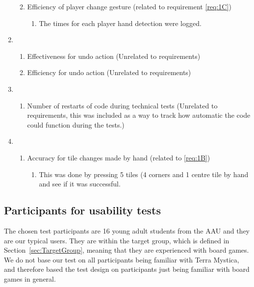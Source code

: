 \begin{enumerate}
\begin{enumerate}
\begin{enumerate}
		\end{enumerate}
		\item Efficiency of player change gesture (related to requirement \ref{req:1C})
		\begin{enumerate}
				\item The times for each player hand detection were logged.
		\end{enumerate}
	\end{enumerate}
	\item \begin{enumerate}
		\item Effectiveness for undo action (Unrelated to requirements)
		\item Efficiency for undo action (Unrelated to requirements)
	\end{enumerate}
	\item \begin{enumerate}
		\item Number of restarts of code during technical tests (Unrelated to requirements, this was included as a way to track how automatic the code could function during the tests.)
	\end{enumerate}
	\item \begin{enumerate}
		\item Accuracy for tile changes made by hand (related to \ref{req:1B})
		\begin{enumerate}
				\item This was done by pressing 5 tiles (4 corners and 1 centre tile by hand and see if it was successful.
		\end{enumerate}
	\end{enumerate}
\end{enumerate}

\subsection{Participants for usability tests}
The chosen test participants are 16 young adult students from the AAU and they are our typical users. They are within the target group, which is defined in Section~\ref{sec:TargetGroup}, meaning that they are experienced with board games. We do not base our test on all participants being familiar with Terra Mystica, and therefore based the test design on participants just being familiar with board games in general. 

